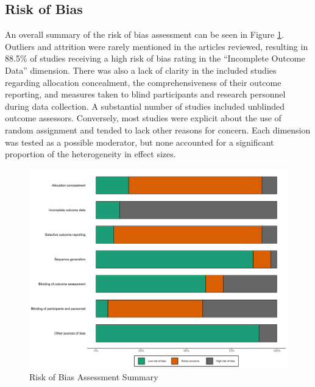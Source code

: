 \documentclass[
  english,
  man, donotrepeattitle,mask,floatsintext]{apa7}
\begin{document}
\hypertarget{risk-of-bias}{%
\subsection{Risk of Bias}\label{risk-of-bias}}

An overall summary of the risk of bias assessment can be seen in Figure \ref{fig:fig2}. Outliers and attrition were rarely mentioned in the articles reviewed, resulting in 88.5\% of studies receiving a high risk of bias rating in the ``Incomplete Outcome Data'' dimension. There was also a lack of clarity in the included studies regarding allocation concealment, the comprehensiveness of their outcome reporting, and measures taken to blind participants and research personnel during data collection. A substantial number of studies included unblinded outcome assessors. Conversely, most studies were explicit about the use of random assignment and tended to lack other reasons for concern. Each dimension was tested as a possible moderator, but none accounted for a significant proportion of the heterogeneity in effect sizes.



\begin{figure}

{\centering \includegraphics[height=0.6\textheight]{../../figures/fig2} 

}

\caption{Risk of Bias Assessment Summary}\label{fig:fig2}
\end{figure}
\end{document}

